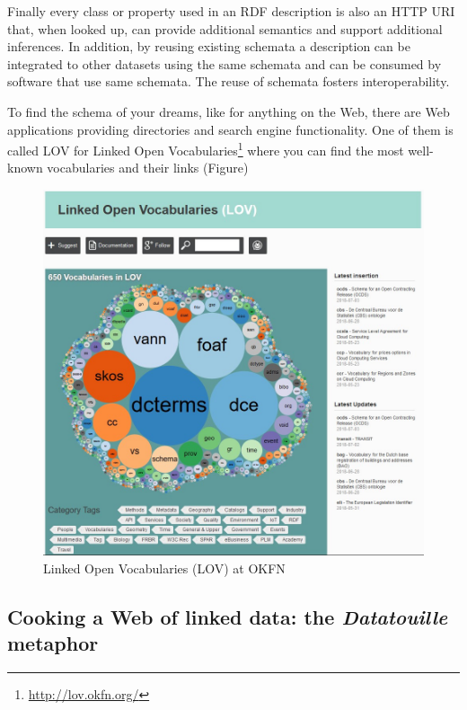 Finally every class or property used in an RDF description is also an
HTTP URI that, when looked up, can provide additional semantics and
support additional inferences. In addition, by reusing existing schemata
a description can be integrated to other datasets using the same
schemata and can be consumed by software that use same schemata. The
reuse of schemata fosters interoperability.

To find the schema of your dreams, like for anything on the Web, there
are Web applications providing directories and search engine
functionality. One of them is called LOV for Linked Open
Vocabularies\footnote{\url{http://lov.okfn.org/}} where you can find the
most well-known vocabularies and their links (Figure)

\begin{figure}
    \centering
\includegraphics[width=5.0in]{media/figure-05-12.jpg}
    \caption{Linked Open Vocabularies (LOV) at OKFN}
    \label{fig:ch5.12}
\end{figure}

\hypertarget{cooking-a-web-of-linked-data-the-datatouille-metaphor}{%
\subsection{\texorpdfstring{Cooking a Web of linked data: the
\emph{Datatouille}
metaphor}{Cooking a Web of linked data: the Datatouille metaphor}}\label{cooking-a-web-of-linked-data-the-datatouille-metaphor}}


